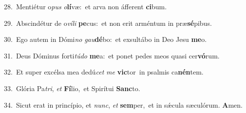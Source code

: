 {\numbfont\textcolor{\numbcolor}{28.}}~Mentiétur o\textit{pus} \textit{o}\-\textbf{lí}væ:~\star et arva non áfferent \textbf{ci}\-bum.\par
{\numbfont\textcolor{\numbcolor}{29.}}~Abscindétur de o\-\textit{ví}\-\textit{li} \textbf{pe}\-cus:~\star et non erit arméntum in præ\-\textbf{sé}\-pibus.\par
{\numbfont\textcolor{\numbcolor}{30.}}~Ego autem in Dómi\textit{no} \textit{gau}\-\textbf{dé}bo:~\star et exsultábo in Deo Jesu \textbf{me}\-o.\par
{\numbfont\textcolor{\numbcolor}{31.}}~Deus Dóminus forti\-\textit{tú}\-\textit{do} \textbf{me}\-a:~\star et ponet pedes meos quasi cer\-\textbf{vó}\-rum.\par
{\numbfont\textcolor{\numbcolor}{32.}}~Et super excélsa mea dedú\textit{cet} \textit{me} \textbf{vic}\-tor~\star in psalmis ca\-\textbf{nén}\-tem.\par
{\numbfont\textcolor{\numbcolor}{33.}}~Glória Pa\-\textit{tri}\-, \textit{et} \textbf{Fí}\-lio,~\star et Spirítui \textbf{Sanc}\-to.\par
{\numbfont\textcolor{\numbcolor}{34.}}~Sicut erat in princípio, et \textit{nunc}\-, \textit{et} \textbf{sem}\-per,~\star et in sǽcula sæculórum. \textbf{A}\-men.\par
